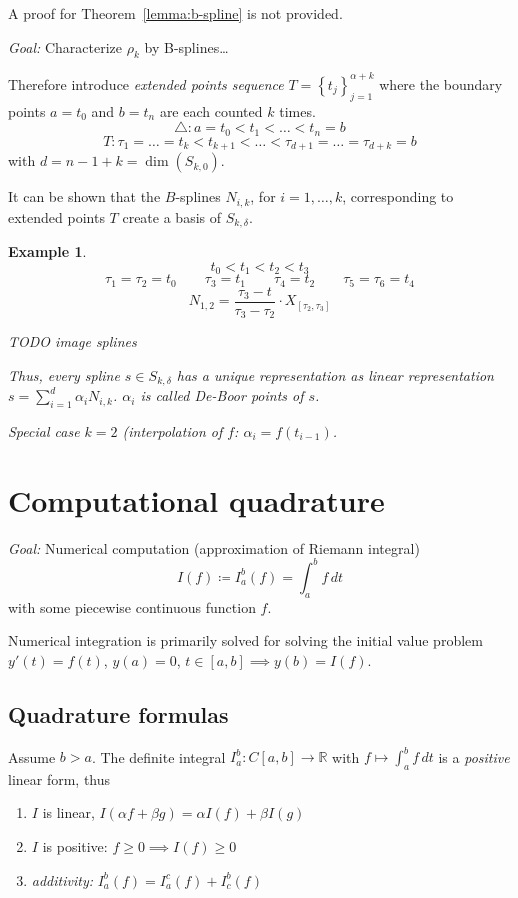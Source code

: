\documentclass[a4paper]{article}
\newcounter{lecref}[section]
\numberwithin{lecref}{section}
\theoremstyle{break}
\newtheorem{example}[lecref]{Example}
\newcommand{\Set}[1]{\left\{#1\right\}}
\newcommand{\noproof}[1]{A proof for Theorem~\ref{#1} is not provided.}
\begin{document}
\noproof{lemma:b-spline}

\emph{Goal:} Characterize $\rho_{k}$ by B-splines\dots

Therefore introduce \emph{extended points sequence} $T = \Set{t_j}_{j=1}^{\alpha+k}$ where the boundary points $a = t_0$ and $b = t_n$ are each counted $k$ times.
\[ \triangle: a = t_0 < t_1 < \dots < t_n = b \]
\[ T: \tau_1 = \dots = t_k < t_{k+1} < \dots < \tau_{d+1} = \dots = \tau_{d+k} = b \]
with $d = n-1+k = \dim(S_{k,0})$.

It can be shown that the $B$-splines $N_{i,k}$, for $i = 1, \dots, k$, corresponding to extended points $T$ create a basis of $S_{k,\delta}$.

\begin{example}
  \[ t_0 < t_1 < t_2 < t_3 \]
  \[ \tau_1 = \tau_2 = t_0 \qquad \tau_3 = t_1 \qquad \tau_4 = t_2 \qquad \tau_5 = \tau_6 = t_4 \]
  \[ N_{1,2} = \frac{\tau_3 - t}{\tau_3 - \tau_2} \cdot X_{[\tau_2, \tau_3]} \]


  TODO image splines

  Thus, every spline $s \in S_{k, \delta}$ has a unique representation as linear representation $s = \sum_{i=1}^d \alpha_i N_{i,k}$. $\alpha_i$ is called \emph{De-Boor points} of $s$.

  Special case $k=2$ (interpolation of $f$: $\alpha_i = f(t_{i-1})$.
\end{example}


\section{Computational quadrature}
\label{sec:5}

\emph{Goal:} Numerical computation (approximation of Riemann integral)
\[ I(f) \coloneqq I_a^b(f) = \int_a^b f \, dt \]
with some piecewise continuous function $f$.

Numerical integration is primarily solved for solving the initial value problem $y'(t) = f(t)$, $y(a) = 0$, $t \in [a, b] \implies y(b) = I(f)$.

\subsection{Quadrature formulas}
\label{sec:5-1}

Assume $b > a$. The definite integral $I_a^b: C[a, b] \to \mathbb R$ with $f \mapsto \int_a^b f \, dt$ is a \emph{positive} linear form, thus
\begin{enumerate}
  \item $I$ is linear, $I(\alpha f + \beta g) = \alpha I(f) + \beta I(g)$
  \item $I$ is positive: $f \geq 0 \implies I(f) \geq 0$
  \item \emph{additivity:} $I_a^b(f) = I_a^c(f) + I_c^b(f)$
\end{enumerate}
\end{document}
